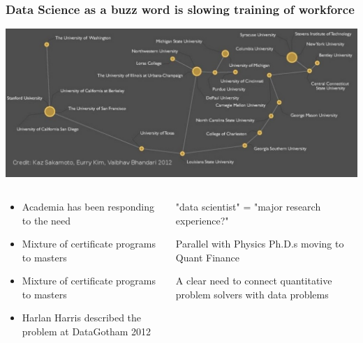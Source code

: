 \begin{frame}
\frametitle{Data Science as a buzz word is slowing training of workforce}

\begin{center}
\includegraphics[width=1.0\textwidth]{graphics/courseconstellation.pdf}

\begin{columns}

\begin{column}{0.5\textwidth}
\begin{center}
\begin{itemize}
    \item \tiny{Academia has been responding to the need}
    \item \tiny{Mixture of certificate programs to masters}
    \item \tiny{Mixture of certificate programs to masters} 
    \item \tiny{Harlan Harris described the problem at DataGotham 2012}
\end{itemize}
\end{center}
\end{column}

\begin{column}{0.5\textwidth}
\begin{itemize}
    \tiny{\item "data scientist" = "major research experience?"}
    \tiny{\item Parallel with Physics Ph.D.s moving to Quant Finance}
    \tiny{\item A clear need to connect quantitative problem solvers with data problems}
\end{itemize}
\end{column}

\end{columns}

\end{center}

\end{frame}

